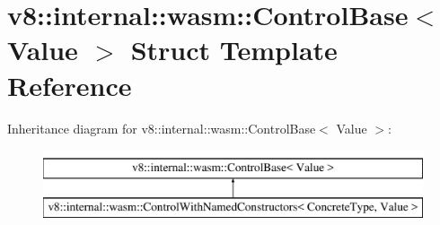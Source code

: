 \hypertarget{structv8_1_1internal_1_1wasm_1_1ControlBase}{}\section{v8\+:\+:internal\+:\+:wasm\+:\+:Control\+Base$<$ Value $>$ Struct Template Reference}
\label{structv8_1_1internal_1_1wasm_1_1ControlBase}
Inheritance diagram for v8\+:\+:internal\+:\+:wasm\+:\+:Control\+Base$<$ Value $>$\+:\begin{figure}[H]
\begin{center}
\leavevmode
\includegraphics[height=2.000000cm]{structv8_1_1internal_1_1wasm_1_1ControlBase}
\end{center}
\end{figure}
